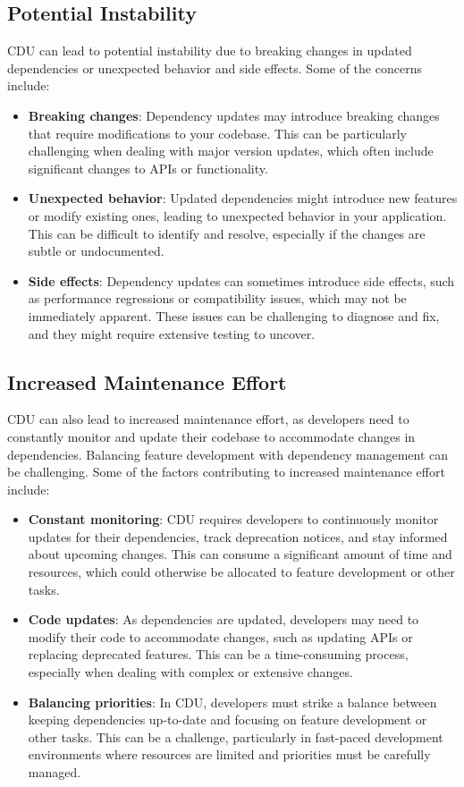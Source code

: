 \documentclass[10pt]{article}
\begin{document}
\subsection{Potential Instability}
CDU can lead to potential instability due to breaking changes in updated dependencies or unexpected behavior and side effects. Some of the concerns include:

\begin{itemize}
  \item \textbf{Breaking changes}: Dependency updates may introduce breaking changes that require modifications to your codebase. This can be particularly challenging when dealing with major version updates, which often include significant changes to APIs or functionality.
  \item \textbf{Unexpected behavior}: Updated dependencies might introduce new features or modify existing ones, leading to unexpected behavior in your application. This can be difficult to identify and resolve, especially if the changes are subtle or undocumented.
  \item \textbf{Side effects}: Dependency updates can sometimes introduce side effects, such as performance regressions or compatibility issues, which may not be immediately apparent. These issues can be challenging to diagnose and fix, and they might require extensive testing to uncover.
\end{itemize}

\subsection{Increased Maintenance Effort}
CDU can also lead to increased maintenance effort, as developers need to constantly monitor and update their codebase to accommodate changes in dependencies. Balancing feature development with dependency management can be challenging. Some of the factors contributing to increased maintenance effort include:

\begin{itemize}
  \item \textbf{Constant monitoring}: CDU requires developers to continuously monitor updates for their dependencies, track deprecation notices, and stay informed about upcoming changes. This can consume a significant amount of time and resources, which could otherwise be allocated to feature development or other tasks.
  \item \textbf{Code updates}: As dependencies are updated, developers may need to modify their code to accommodate changes, such as updating APIs or replacing deprecated features. This can be a time-consuming process, especially when dealing with complex or extensive changes.
  \item \textbf{Balancing priorities}: In CDU, developers must strike a balance between keeping dependencies up-to-date and focusing on feature development or other tasks. This can be a challenge, particularly in fast-paced development environments where resources are limited and priorities must be carefully managed.
\end{itemize}
\end{document}
